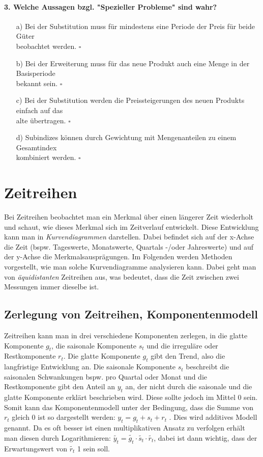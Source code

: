 \documentclass[a4paper]{article}
\begin{document}
\paragraph{3. Welche Aussagen bzgl. "Spezieller Probleme" sind wahr?}

\begin{itemize}
    \item[a)] Bei der Substitution muss für mindestens eine Periode der Preis für beide Güter\\beobachtet werden. \hfill $\square$
    \item[b)] Bei der Erweiterung muss für das neue Produkt auch eine Menge in der Basisperiode\\bekannt sein. \hfill $\square$
    \item[c)] Bei der Substitution werden die Preissteigerungen des neuen Produkts einfach auf das\\alte übertragen. \hfill $\square$
    \item[d)] Subindizes können durch Gewichtung mit Mengenanteilen zu einem Gesamtindex\\kombiniert werden. \hfill $\square$
\end{itemize}

\newpage

\section{Zeitreihen}
Bei Zeitreihen beobachtet man ein Merkmal über einen längerer Zeit wiederholt und schaut, wie dieses Merkmal sich im Zeitverlauf entwickelt. Diese Entwicklung kann man in \textit{Kurvendiagrammen} darstellen. Dabei befindet sich auf der x-Achse die Zeit (bspw. Tageswerte, Monatswerte, Quartals -/oder Jahreswerte) und auf der y-Achse die Merkmalsausprägungen. Im Folgenden werden Methoden vorgestellt, wie man solche Kurvendiagramme analysieren kann. Dabei geht man von \textit{äquidistanten} Zeitreihen aus, was bedeutet, dass die Zeit zwischen zwei Messungen immer dieselbe ist.


\subsection{Zerlegung von Zeitreihen, Komponentenmodell}
Zeitreihen kann man in drei verschiedene Komponenten zerlegen, in die glatte Komponente $g_t$, die saisonale Komponente $s_t$ und die irreguläre oder Restkomponente $r_t$.
Die glatte Komponente $g_t$ gibt den Trend, also die langfristige Entwicklung an. Die saisonale Komponente $s_t$ beschreibt die saisonalen Schwankungen bspw. pro Quartal oder Monat und die Restkomponente gibt den Anteil an $y_t$ an, der nicht durch die saisonale und die glatte Komponente erklärt beschrieben wird. Diese sollte jedoch im Mittel 0 sein.\\
Somit kann das Komponentenmodell unter der Bedingung, dass die Summe von $r_t$ gleich 0 ist so dargestellt werden: $y_t=g_t+s_t+r_t$ . Dies wird additives Modell genannt. Da es oft besser ist einen multiplikativen Ansatz zu verfolgen erhält man diesen durch Logarithmieren: $\tilde{y_t}=\tilde{g_t}\cdot \tilde{s_t}\cdot\tilde{r_t}$, dabei ist dann wichtig, dass der Erwartungswert von $\tilde{r_t}$ 1 sein soll.
\end{document}
